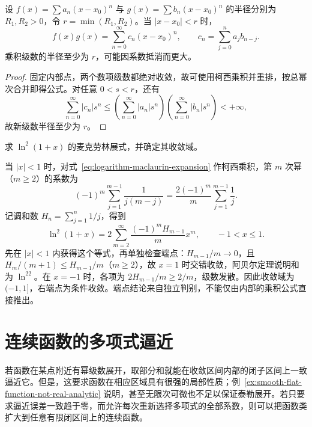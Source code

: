 \begin{proposition}[幂级数的乘积]
\label{prop:product-of-power-series}
设 $f(x)=\sum a_n(x-x_0)^n$ 与 $g(x)=\sum b_n(x-x_0)^n$ 的半径分别为 $R_1,R_2>0$，令 $r=\min(R_1,R_2)$。当 $|x-x_0|<r$ 时，
\begin{equation}
    f(x)g(x)=\sum_{n=0}^\infty c_n(x-x_0)^n,
    \qquad c_n=\sum_{j=0}^na_jb_{n-j}.
    \label{eq:cauchy-product-of-power-series}
\end{equation}
乘积级数的半径至少为 $r$，可能因系数抵消而更大。
\end{proposition}

\begin{proof}
固定内部点，两个数项级数都绝对收敛，故可使用柯西乘积并重排，按总幂次合并即得公式。对任意 $0<s<r$，还有
\[
    \sum_{n=0}^\infty|c_n|s^n
       \leq\left(\sum_{n=0}^\infty|a_n|s^n\right)
          \left(\sum_{n=0}^\infty|b_n|s^n\right)<+\infty,
\]
故新级数半径至少为 $r$。
\end{proof}

\begin{example}
\label{ex:square-logarithm-maclaurin-expansion}
求 $\ln^2(1+x)$ 的麦克劳林展式，并确定其收敛域。
\end{example}

\begin{solve}
当 $|x|<1$ 时，对式~\eqref{eq:logarithm-maclaurin-expansion} 作柯西乘积，第 $m$ 次幂（$m\geq2$）的系数为
\[
    (-1)^m\sum_{j=1}^{m-1}\frac1{j(m-j)}
       =\frac{2(-1)^m}{m}\sum_{j=1}^{m-1}\frac1j.
\]
记调和数 $H_n=\sum_{j=1}^n1/j$，得到
\begin{equation}
    \ln^2(1+x)=2\sum_{m=2}^\infty
        \frac{(-1)^mH_{m-1}}m x^m,
    \qquad -1<x\leq1.
    \label{eq:square-logarithm-maclaurin-expansion}
\end{equation}
先在 $|x|<1$ 内获得这个等式，再单独检查端点：$H_{m-1}/m\to0$，且 $H_m/(m+1)\leq H_{m-1}/m$（$m\geq2$），故 $x=1$ 时交错收敛，阿贝尔定理说明和为 $\ln^22$。在 $x=-1$ 时，各项为 $2H_{m-1}/m\geq2/m$，级数发散。因此收敛域为 $(-1,1]$，右端点为条件收敛。端点结论来自独立判别，不能仅由内部的乘积公式直接推出。
\end{solve}

\section{连续函数的多项式逼近}
\label{sec:polynomial-approximation-of-continuous-functions}

若函数在某点附近有幂级数展开，取部分和就能在收敛区间内部的闭子区间上一致逼近它。但是，这要求函数在相应区域具有很强的局部性质；例~\ref{ex:smooth-flat-function-not-real-analytic} 说明，甚至无限次可微也不足以保证泰勒展开。若只要求逼近误差一致趋于零，而允许每次重新选择多项式的全部系数，则可以把函数类扩大到任意有限闭区间上的连续函数。

